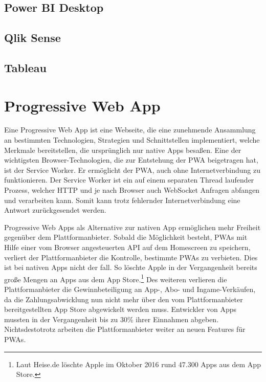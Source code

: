 \subsection{Power BI Desktop}


\subsection{Qlik Sense}

\subsection{Tableau}

\section{Progressive Web App}
Eine Progressive Web App ist eine Webseite, die eine zunehmende Ansammlung an bestimmten Technologien,
Strategien und Schnittstellen implementiert, welche Merkmale bereitstellen, die ursprünglich nur
native Apps besaßen.\cite{WikiPWA} Eine der wichtigsten Browser-Technologien, die zur Entstehung der PWA beigetragen hat,
ist der Service Worker. Er ermöglicht der PWA, auch ohne Internetverbindung zu funktionieren. Der 
Service Worker ist ein auf einem separaten Thread laufender Prozess, welcher HTTP und je nach Browser
auch WebSocket Anfragen abfangen und verarbeiten kann. Somit kann trotz fehlernder Internetverbindung
eine Antwort zurückgesendet werden. \cite{W3ServiceWorker}

Progressive Web Apps als Alternative zur nativen App ermöglichen mehr Freiheit gegenüber dem
Plattformanbieter. Sobald die Möglichkeit besteht, PWAs mit Hilfe einer vom Browser angesteuerten API
auf dem Homescreen zu speichern, verliert der Plattformanbieter die Kontrolle,
bestimmte PWAs zu verbieten. Dies ist bei nativen Apps nicht der fall. So löschte Apple in der Vergangenheit
bereits große Mengen an Apps aus dem App Store.\footnote[1]{Laut Heise.de löschte Apple im Oktober 2016 rund 47.300 Apps aus dem App Store.\cite{HeiseAppleLoeschtApps}} 
Des weiteren verlieren die Plattformanbieter die Gewinnbeteiligung an App-, Abo- und Ingame-Verkäufen,
da die Zahlungsabwicklung nun nicht mehr über den vom Plattformanbieter bereitgestellten App Store
abgewickelt werden muss. Entwickler von Apps mussten in der Vergangenheit bis zu 30\% 
ihrer Einnahmen abgeben. \cite{WinFutureEigenerAppStore} Nichtsdestotrotz arbeiten
die Plattformanbieter weiter an neuen Features für PWAs.

